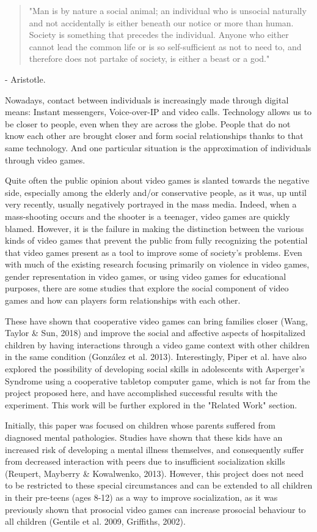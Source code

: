 \documentclass[runningheads]{llncs}
\begin{document}
\begin{quotation}
"Man is by nature a social animal; an individual who is unsocial naturally and not accidentally is either beneath our notice or more than human. Society is something that precedes the individual. Anyone who either cannot lead the common life or is so self-sufficient as not to need to, and therefore does not partake of society, is either a beast or a god."
\end{quotation}
\par - Aristotle.
\newline
\par Nowadays, contact between individuals is increasingly made through digital means: Instant messengers, Voice-over-IP and video calls. Technology allows us to be closer to people, even when they are across the globe. People that do not know each other are brought closer and form social relationships thanks to that same technology. And one particular situation is the approximation of individuals through video games.
\par Quite often the public opinion about video games is slanted towards the negative side, especially among the elderly and/or conservative people, as it was, up until very recently, usually negatively portrayed in the mass media. Indeed, when a mass-shooting occurs and the shooter is a teenager, video games are quickly blamed. However, it is the failure in making the distinction between the various kinds of video games that prevent the public from fully recognizing the potential that video games present as a tool to improve some of society's problems. Even with much of the existing research focusing primarily on violence in video games, gender representation in video games, or using video games for educational purposes, there are some studies that explore the social component of video games and how can players form relationships with each other.
\par These have shown that cooperative video games can bring families closer (Wang, Taylor \& Sun, 2018) and improve the social and affective aspects of hospitalized children by having interactions through a video game context with other children in the same condition (González et al. 2013). Interestingly, Piper et al. have also explored the possibility of developing social skills in adolescents with Asperger's Syndrome using a cooperative tabletop computer game, which is not far from the project proposed here, and have accomplished successful results with the experiment. This work will be further explored in the "Related Work" section.
\par Initially, this paper was focused on children whose parents suffered from diagnosed mental pathologies. Studies have shown that these kids have an increased risk of developing a mental illness themselves, and consequently suffer from decreased interaction with peers due to insufficient socialization skills (Reupert, Mayberry \& Kowalwenko, 2013). However, this project does not need to be restricted to these special circumstances and can be extended to all children in their pre-teens (ages 8-12) as a way to improve socialization, as it was previously shown that prosocial video games can increase prosocial behaviour to all children (Gentile et al. 2009, Griffiths, 2002).
\end{document}
